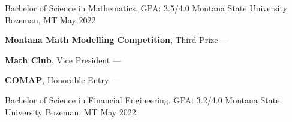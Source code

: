 
\begin{cventries}
  \cventry
    {Bachelor of Science in Mathematics, GPA: 3.5/4.0} %
    {Montana State University} %
    {Bozeman, MT} %
    {May 2022} %
    {
      \begin{cvitems} %
        \item {\textbf{Montana Math Modelling Competition}, Third Prize --- }
        \vspace{0.5mm}
        \item {\textbf{Math Club}, Vice President --- }
        \vspace{0.5mm}
        \item {\textbf{COMAP}, Honorable Entry --- }
      \end{cvitems}
    }
    {Bachelor of Science in Financial Engineering, GPA: 3.2/4.0} %
    {Montana State University} %
    {Bozeman, MT} %
    {May 2022} %
    
    
      

\end{cventries}
